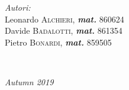 \documentclass[12pt]{article}
\begin{document}
\begin{titlepage}

\begin{minipage}{0.6\textwidth}
\flushleft
\large \emph{Autori:}\\
Leonardo \textsc{Alchieri}, \textit{\textbf{mat.}} 860624\\ %
Davide \textsc{Badalotti}, \textit{\textbf{mat.}} 861354\\ %
Pietro \textsc{Bonardi}, \textit{\textbf{mat.}} 859505\\ %

\end{minipage}\\[2cm]



\begin{flushright}
{\large \textit{Autumn 2019}}\\[2cm] %
\end{flushright}
\vfill %

\end{titlepage}
\end{document}
